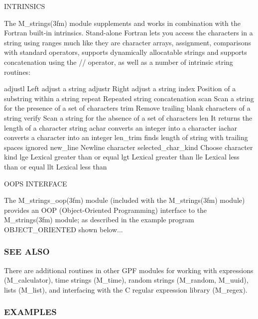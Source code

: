 \begin{DoxyVerb}INTRINSICS

The M_strings(3fm) module supplements and works in combination with
the Fortran built-in intrinsics. Stand-alone
Fortran lets you access the characters in a string using ranges
much like they are character arrays, assignment, comparisons with
standard operators, supports dynamically allocatable strings and
supports concatenation using the // operator, as well as a number
of intrinsic string routines:

    adjustl             Left adjust a string
    adjustr             Right adjust a string
    index               Position of a substring within a string
    repeat              Repeated string concatenation
    scan                Scan a string for the presence of a set of characters
    trim                Remove trailing blank characters of a string
    verify              Scan a string for the absence of a set of characters
    len                 It returns the length of a character string
    achar               converts an integer into a character
    iachar              converts a character into an integer
    len_trim            finds length of string with trailing spaces ignored
    new_line            Newline character
    selected_char_kind  Choose character kind
    lge                 Lexical greater than or equal
    lgt                 Lexical greater than
    lle                 Lexical less than or equal
    llt                 Lexical less than

OOPS INTERFACE

The M_strings_oop(3fm) module (included with the M_strings(3fm)
module) provides an OOP (Object-Oriented Programming) interface
to the M_strings(3fm) module; as described in the example program
OBJECT_ORIENTED shown below...
\end{DoxyVerb}


\subsubsection*{S\+EE A\+L\+SO}

\begin{DoxyVerb}There are additional routines in other GPF modules for working with
expressions (M_calculator), time strings (M_time), random strings
(M_random, M_uuid), lists (M_list), and interfacing with the C regular
expression library (M_regex).
\end{DoxyVerb}


\subsubsection*{E\+X\+A\+M\+P\+L\+ES}

